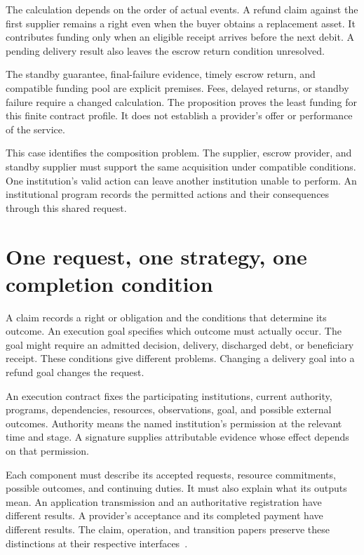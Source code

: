 \documentclass{momentum}
\begin{document}
The calculation depends on the order of actual events.
A refund claim against the first supplier remains a right even when the buyer obtains a replacement asset.
It contributes funding only when an eligible receipt arrives before the next debit.
A pending delivery result also leaves the escrow return condition unresolved.

The standby guarantee, final-failure evidence, timely escrow return, and compatible funding pool are explicit premises.
Fees, delayed returns, or standby failure require a changed calculation.
The proposition proves the least funding for this finite contract profile.
It does not establish a provider's offer or performance of the service.

This case identifies the composition problem.
The supplier, escrow provider, and standby supplier must support the same acquisition under compatible conditions.
One institution's valid action can leave another institution unable to perform.
An institutional program records the permitted actions and their consequences through this shared request.

\section{One request, one strategy, one completion condition}
\label{sec:contract}

A claim records a right or obligation and the conditions that determine its outcome.
An execution goal specifies which outcome must actually occur.
The goal might require an admitted decision, delivery, discharged debt, or beneficiary receipt.
These conditions give different problems.
Changing a delivery goal into a refund goal changes the request.

An execution contract fixes the participating institutions, current authority, programs, dependencies, resources, observations, goal, and possible external outcomes.
Authority means the named institution's permission at the relevant time and stage.
A signature supplies attributable evidence whose effect depends on that permission.

Each component must describe its accepted requests, resource commitments, possible outcomes, and continuing duties.
It must also explain what its outputs mean.
An application transmission and an authoritative registration have different results.
A provider's acceptance and its completed payment have different results.
The claim, operation, and transition papers preserve these distinctions at their respective interfaces~\cite{claim,op,transitions}.
\end{document}
